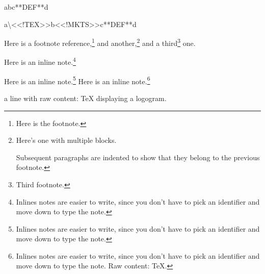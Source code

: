 
\mktsShowpar\par
abc**DEF**d\mktsShowpar\par
{\mktsStyleCode{}a\textbackslash{}<<!TEX>>b<<!MKTS>>c**DEF**d}\mktsShowpar\par
Here is a footnote reference,\footnote{Here is the footnote.} and another,\footnote{Here’s one with multiple blocks.\mktsShowpar\par
Subsequent paragraphs are indented to show that they
belong to the previous footnote.}
and a third\footnote{Third footnote.} one.\mktsShowpar\par
Here is an inline note.\footnote{Inlines notes are easier to write, since
you don't have to pick an identifier and move down to type the
note.}\mktsShowpar\par
Here is an inline note.\footnote{Inlines notes are easier to write, since
you don't have to pick an identifier and move down to type the
note.} Here is an inline note.\footnote{Inlines notes are easier to write, since
you don't have to pick an identifier and move down to type the
note. Raw content: \TeX{}.}\mktsShowpar\par
a line with raw content: \TeX{} displaying a logogram.

